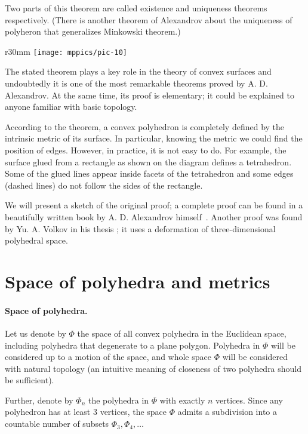 \documentclass[oneside,a4paper]{article}
\begin{document}
Two parts of this theorem are called existence and uniqueness theorems respectively.
(There is another theorem of Alexandrov about the uniqueness of polyheron that generalizes Minkowski theorem.)

\begin{wrapfigure}{r}{30mm}
\vskip-0mm
\centering
\texttt{[image: mppics/pic-10]}
\vskip-0mm
\end{wrapfigure}

The stated theorem plays a key role in the theory of convex surfaces and undoubtedly it is one of the most remarkable theorems proved by A. D. Alexandrov.
At the same time, its proof is elementary;
it could be explained to anyone familiar with basic topology.


According to the theorem, a convex polyhedron is completely defined by the intrinsic metric of its surface.
In particular, knowing the metric we could find the position of edges.
However, in practice, it is not easy to do.
For example, the surface glued from a rectangle as shown on the diagram defines a tetrahedron.
Some of the glued lines appear inside facets of the tetrahedron and some edges (dashed lines) do not follow the sides of the rectangle.

We will present a sketch of the original proof;
a complete proof can be found in a beautifully written book by A. D. Alexandrov himself~\cite{alexandrov}.
Another proof was found by Yu. A. Volkov in his thesis \cite{volkov};
it uses a deformation of three-dimensional polyhedral space.


\section{Space of polyhedra and metrics}

\paragraph{Space of polyhedra.}
Let us denote by $\Phi$ the space of all convex polyhedra in the Euclidean space,
including polyhedra that degenerate to a plane polygon.
Polyhedra in $\Phi$ will be considered up to a motion of the space, 
and whole space $\Phi$ will be considered with natural topology (an intuitive meaning of closeness of two polyhedra should be sufficient).  

Further, denote by $\Phi_n$ the polyhedra in $\Phi$ with exactly $n$ vertices.
Since any polyhedron has at least 3 vertices, the space $\Phi$ admits a subdivision into a countable number of subsets $\Phi_3,\Phi_4,\dots$
\end{document}
